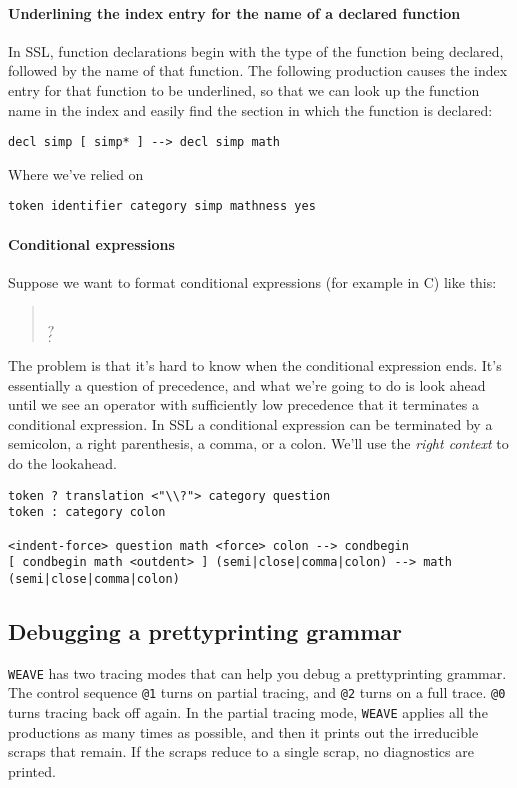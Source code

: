 \paragraph{Underlining the index entry for the name of a declared
function}
In SSL, function declarations begin with the type of the function
being declared, followed by the name of that function.
The following production causes the index entry for that function to
be underlined, so that we can look up the function name in the index
and easily find the section in which the function is declared:
\begin{verbatim} 
decl simp [ simp* ] --> decl simp math
\end{verbatim}
Where we've relied on
\begin{verbatim}
token identifier category simp mathness yes
\end{verbatim}


\paragraph{Conditional expressions}
Suppose we want to format conditional expressions (for example in C)
like this:
\begin{quote}
\\
\mbox{\qquad}$?$ \\
\mbox{\qquad}$:$ 
\end{quote}
The problem is that it's hard to know when the conditional expression
ends.
It's essentially a question of precedence, and what we're going to do
is look ahead until we see an operator with sufficiently low
precedence that it terminates a conditional expression.
In SSL a conditional expression can be terminated by a semicolon, a
right parenthesis, a comma, or a colon.
We'll use the {\em right context} to do the lookahead.
{\small
\begin{verbatim}
token ? translation <"\\?"> category question
token : category colon

<indent-force> question math <force> colon --> condbegin
[ condbegin math <outdent> ] (semi|close|comma|colon) --> math (semi|close|comma|colon)
\end{verbatim}
}

\subsection{Debugging a prettyprinting grammar}
{\tt WEAVE} has two tracing modes that can help you debug a
prettyprinting grammar.
The control sequence {\tt @1} turns on partial tracing, and {\tt @2}
turns on a full trace.  
{\tt @0} turns tracing back off again.
In the partial tracing mode, {\tt WEAVE} applies all the productions
as many times as possible, and then it prints out the irreducible
scraps that remain.
If the scraps reduce to a single scrap,  no diagnostics are printed.


